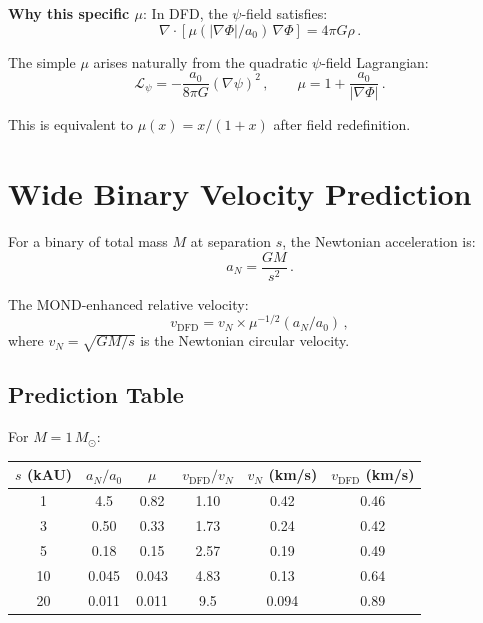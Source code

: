 \documentclass[11pt,a4paper]{article}
\begin{document}
\textbf{Why this specific $\mu$}: In DFD, the $\psi$-field satisfies:
\begin{equation}
\nabla \cdot [\mu(|\nabla\Phi|/a_0)\,\nabla\Phi] = 4\pi G\rho\,.
\end{equation}

The simple $\mu$ arises naturally from the quadratic $\psi$-field Lagrangian:
\begin{equation}
\mathcal{L}_\psi = -\frac{a_0}{8\pi G}(\nabla\psi)^2\,,\qquad \mu = 1 + \frac{a_0}{|\nabla\Phi|}\,.
\end{equation}

This is equivalent to $\mu(x) = x/(1+x)$ after field redefinition.

\section{Wide Binary Velocity Prediction}

For a binary of total mass $M$ at separation $s$, the Newtonian acceleration is:
\begin{equation}
a_N = \frac{GM}{s^2}\,.
\end{equation}

The MOND-enhanced relative velocity:
\begin{equation}
v_{\mathrm{DFD}} = v_N \times \mu^{-1/2}(a_N/a_0)\,,
\end{equation}
where $v_N = \sqrt{GM/s}$ is the Newtonian circular velocity.

\subsection{Prediction Table}

For $M = 1\,M_\odot$:
\begin{center}
\begin{tabular}{cccccc}
\toprule
$s$ (kAU) & $a_N/a_0$ & $\mu$ & $v_{\mathrm{DFD}}/v_N$ & $v_N$ (km/s) & $v_{\mathrm{DFD}}$ (km/s) \\
\midrule
1 & 4.5 & 0.82 & 1.10 & 0.42 & 0.46 \\
3 & 0.50 & 0.33 & 1.73 & 0.24 & 0.42 \\
5 & 0.18 & 0.15 & 2.57 & 0.19 & 0.49 \\
10 & 0.045 & 0.043 & 4.83 & 0.13 & 0.64 \\
20 & 0.011 & 0.011 & 9.5 & 0.094 & 0.89 \\
\bottomrule
\end{tabular}
\end{center}
\end{document}
